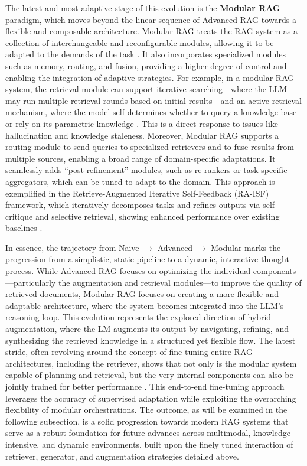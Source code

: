 \documentclass[11pt]{article}
\begin{document}
The latest and most adaptive stage of this evolution is the \textbf{Modular RAG} paradigm, which moves beyond the linear sequence of Advanced RAG towards a flexible and composable architecture. Modular RAG treats the RAG system as a collection of interchangeable and reconfigurable modules, allowing it to be adapted to the demands of the task \cite{ref1}. It also incorporates specialized modules such as memory, routing, and fusion, providing a higher degree of control and enabling the integration of adaptive strategies. For example, in a modular RAG system, the retrieval module can support iterative searching---where the LLM may run multiple retrieval rounds based on initial results---and an active retrieval mechanism, where the model self-determines whether to query a knowledge base or rely on its parametric knowledge \cite{ref1}. This is a direct response to issues like hallucination and knowledge staleness. Moreover, Modular RAG supports a routing module to send queries to specialized retrievers and to fuse results from multiple sources, enabling a broad range of domain-specific adaptations. It seamlessly adds ``post-refinement'' modules, such as re-rankers or task-specific aggregators, which can be tuned to adapt to the domain. This approach is exemplified in the Retrieve-Augmented Iterative Self-Feedback (RA-ISF) framework, which iteratively decomposes tasks and refines outputs via self-critique and selective retrieval, showing enhanced performance over existing baselines \cite{ref5}.

In essence, the trajectory from Naive \(\rightarrow\) Advanced \(\rightarrow\) Modular marks the progression from a simplistic, static pipeline to a dynamic, interactive thought process. While Advanced RAG focuses on optimizing the individual components---particularly the augmentation and retrieval modules---to improve the quality of retrieved documents, Modular RAG focuses on creating a more flexible and adaptable architecture, where the system becomes integrated into the LLM's reasoning loop. This evolution represents the explored direction of hybrid augmentation, where the LM augments its output by navigating, refining, and synthesizing the retrieved knowledge in a structured yet flexible flow. The latest stride, often revolving around the concept of fine-tuning entire RAG architectures, including the retriever, shows that not only is the modular system capable of planning and retrieval, but the very internal components can also be jointly trained for better performance \cite{ref6}. This end-to-end fine-tuning approach leverages the accuracy of supervised adaptation while exploiting the overarching flexibility of modular orchestrations. The outcome, as will be examined in the following subsection, is a solid progression towards modern RAG systems that serve as a robust foundation for future advances across multimodal, knowledge-intensive, and dynamic environments, built upon the finely tuned interaction of retriever, generator, and augmentation strategies detailed above.
\end{document}

